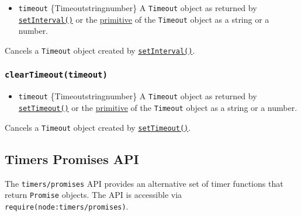 \begin{itemize}
\tightlist
\item
  \texttt{timeout} \{Timeout\textbar string\textbar number\} A
  \texttt{Timeout} object as returned by
  \hyperref[setintervalcallback-delay-args]{\texttt{setInterval()}} or
  the \hyperref[timeoutsymboltoprimitive]{primitive} of the
  \texttt{Timeout} object as a string or a number.
\end{itemize}

Cancels a \texttt{Timeout} object created by
\hyperref[setintervalcallback-delay-args]{\texttt{setInterval()}}.

\subsubsection{\texorpdfstring{\texttt{clearTimeout(timeout)}}{clearTimeout(timeout)}}\label{cleartimeouttimeout}

\begin{itemize}
\tightlist
\item
  \texttt{timeout} \{Timeout\textbar string\textbar number\} A
  \texttt{Timeout} object as returned by
  \hyperref[settimeoutcallback-delay-args]{\texttt{setTimeout()}} or the
  \hyperref[timeoutsymboltoprimitive]{primitive} of the \texttt{Timeout}
  object as a string or a number.
\end{itemize}

Cancels a \texttt{Timeout} object created by
\hyperref[settimeoutcallback-delay-args]{\texttt{setTimeout()}}.

\subsection{Timers Promises API}\label{timers-promises-api}

The \texttt{timers/promises} API provides an alternative set of timer
functions that return \texttt{Promise} objects. The API is accessible
via
\texttt{require(\textquotesingle{}node:timers/promises\textquotesingle{})}.

\begin{Shaded}
\begin{Highlighting}[]
\NormalTok{ \{}
\OperatorTok{,}
\OperatorTok{,}
\OperatorTok{,}
\NormalTok{\} } \OperatorTok{;}
\end{Highlighting}
\end{Shaded}

